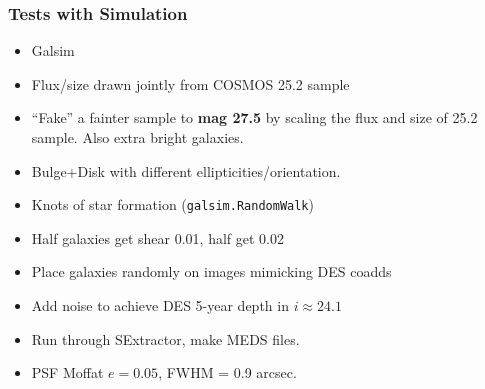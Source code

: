 \documentclass{beamer}
\begin{document}
\frame
{

    \frametitle{Tests with Simulation}


    \begin{itemize}
        \item Galsim
        \item Flux/size drawn jointly from COSMOS 25.2 sample

        \item ``Fake'' a fainter sample to {\bf {\color{brightred} mag 27.5}} by scaling
            the flux and size of 25.2 sample.  Also extra bright galaxies.

        \item Bulge+Disk with different ellipticities/orientation.
        \item Knots of star formation (\texttt{galsim.RandomWalk})

        \item Half galaxies get shear 0.01, half get 0.02

        \item Place galaxies randomly on images mimicking DES coadds

        \item Add noise to achieve DES 5-year depth in $i\approx 24.1$

        \item Run through SExtractor, make MEDS files.

        \item PSF Moffat $e=0.05$, FWHM = 0.9 arcsec.
    \end{itemize}

}
\end{document}
